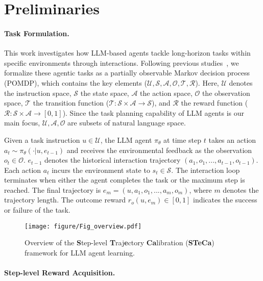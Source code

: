 \section{Preliminaries}

\paragraph{Task Formulation.}
\label{sec:task_form}
This work investigates how LLM-based agents tackle long-horizon tasks within specific environments through interactions.
Following previous studies~\citep{song2024trial, xiong2024watch}, we formalize these agentic tasks as a partially observable Markov decision process (POMDP), which contains the key elements ($\mathcal U, \mathcal S, \mathcal A, \mathcal O, \mathcal T, \mathcal R$). Here, $\mathcal U$ denotes the instruction space, $\mathcal S$ the state space, $\mathcal A$ the action space, $\mathcal O$ the observation space, $\mathcal T$ the transition function ($\mathcal T: \mathcal S \times \mathcal A \rightarrow \mathcal S$), and $\mathcal R$ the reward function ($\mathcal R: \mathcal S \times \mathcal A \rightarrow [0, 1]$). Since the task planning capability of LLM agents is our main focus, $\mathcal U, \mathcal A, \mathcal O$ are subsets of natural language space.

Given a task instruction $u\in\mathcal{U}$, the LLM agent $\pi_{\theta}$ at time step $t$ takes an action $a_t\sim \pi_\theta(\cdot|u, e_{t-1})$ and receives the environmental feedback as the observation $o_t\in\mathcal{O}$. $e_{t-1}$ denotes the historical interaction trajectory $(a_1, o_1, ... , a_{t-1}, o_{t-1})$. Each action $a_t$ incurs the environment state to $s_t\in\mathcal{S}$. The interaction loop terminates when either the agent completes the task or the maximum step is reached.
The final trajectory is $e_m = (u, a_1, o_1, ..., a_m, o_m)$, where $m$ denotes the trajectory length. The outcome reward $r_o(u, e_m) \in [0, 1]$ indicates the success or failure of the task.


\begin{figure*}[t!]
    \centering
    \texttt{[image: figure/Fig\_overview.pdf]}
    \caption{Overview of the \textbf{S}tep-level \textbf{T}raj\textbf{e}ctory \textbf{Ca}libration (\textbf{STeCa}) framework for LLM agent learning.}
    \label{fig:overview}
\end{figure*}


\paragraph{Step-level Reward Acquisition.}
\label{sec:step_reward_compute}

